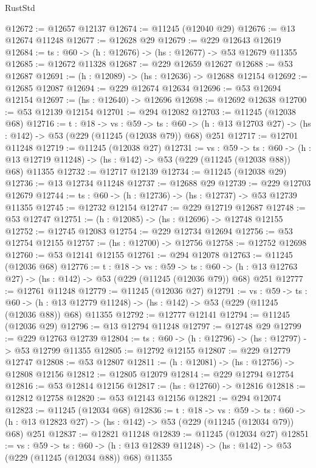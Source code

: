 \begin{lexlean}{RustStd}
\begin{coremodule}
@12672 := @12657 @12137
@12674 := @11245 (@12040 @29)
@12676 := @13 @12674 @11248
@12677 := @12628 @29
@12679 := @229 @12643 @12619
@12684 := {ts : @60} -> (h : @12676) -> (hs : @12677) -> @53 @12679 @11355
@12685 := @12672 @11328
@12687 := @229 @12659 @12627
@12688 := @53 @12687
@12691 := (h : @12089) -> (hs : @12636) -> @12688 @12154
@12692 := @12685 @12087
@12694 := @229 @12674 @12634
@12696 := @53 @12694 @12154
@12697 := (hs : @12640) -> @12696
@12698 := @12692 @12638
@12700 := @53 @12139 @12154
@12701 := @294 @12082
@12703 := @11245 (@12038 @68)
@12716 := {t : @18} ->
  {vs : @59} ->
  {ts : @60} -> (h : @13 @12703 @27) -> (hs : @142) -> @53 (@229 (@11245 (@12038 @79)) @68) @251
@12717 := @12701 @11248
@12719 := @11245 (@12038 @27)
@12731 := {vs : @59} ->
  {ts : @60} ->
  (h : @13 @12719 @11248) -> (hs : @142) -> @53 (@229 (@11245 (@12038 @88)) @68) @11355
@12732 := @12717 @12139
@12734 := @11245 (@12038 @29)
@12736 := @13 @12734 @11248
@12737 := @12688 @29
@12739 := @229 @12703 @12679
@12744 := {ts : @60} -> (h : @12736) -> (hs : @12737) -> @53 @12739 @11355
@12745 := @12732 @12154
@12747 := @229 @12719 @12687
@12748 := @53 @12747
@12751 := (h : @12085) -> (hs : @12696) -> @12748 @12155
@12752 := @12745 @12083
@12754 := @229 @12734 @12694
@12756 := @53 @12754 @12155
@12757 := (hs : @12700) -> @12756
@12758 := @12752 @12698
@12760 := @53 @12141 @12155
@12761 := @294 @12078
@12763 := @11245 (@12036 @68)
@12776 := {t : @18} ->
  {vs : @59} ->
  {ts : @60} -> (h : @13 @12763 @27) -> (hs : @142) -> @53 (@229 (@11245 (@12036 @79)) @68) @251
@12777 := @12761 @11248
@12779 := @11245 (@12036 @27)
@12791 := {vs : @59} ->
  {ts : @60} ->
  (h : @13 @12779 @11248) -> (hs : @142) -> @53 (@229 (@11245 (@12036 @88)) @68) @11355
@12792 := @12777 @12141
@12794 := @11245 (@12036 @29)
@12796 := @13 @12794 @11248
@12797 := @12748 @29
@12799 := @229 @12763 @12739
@12804 := {ts : @60} -> (h : @12796) -> (hs : @12797) -> @53 @12799 @11355
@12805 := @12792 @12155
@12807 := @229 @12779 @12747
@12808 := @53 @12807
@12811 := (h : @12081) -> (hs : @12756) -> @12808 @12156
@12812 := @12805 @12079
@12814 := @229 @12794 @12754
@12816 := @53 @12814 @12156
@12817 := (hs : @12760) -> @12816
@12818 := @12812 @12758
@12820 := @53 @12143 @12156
@12821 := @294 @12074
@12823 := @11245 (@12034 @68)
@12836 := {t : @18} ->
  {vs : @59} ->
  {ts : @60} -> (h : @13 @12823 @27) -> (hs : @142) -> @53 (@229 (@11245 (@12034 @79)) @68) @251
@12837 := @12821 @11248
@12839 := @11245 (@12034 @27)
@12851 := {vs : @59} ->
  {ts : @60} ->
  (h : @13 @12839 @11248) -> (hs : @142) -> @53 (@229 (@11245 (@12034 @88)) @68) @11355

\end{coremodule}
\end{lexlean}

